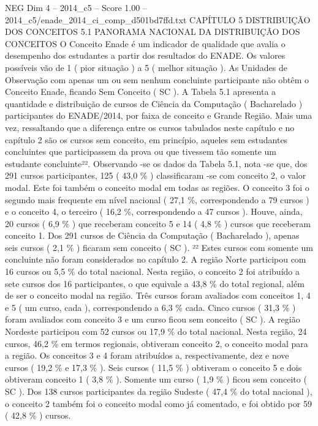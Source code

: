 \begin{textsample}{NEG Dim 4 – 2014\_c5 – Score 1.00 – 2014\_c5/enade\_2014\_ci\_comp\_d501bd7ffd.txt}  \label{ex:f4_neg_199}
CAPÍTULO 5 DISTRIBUIÇÃO DOS CONCEITOS 5.1 PANORAMA NACIONAL DA DISTRIBUIÇÃO DOS CONCEITOS O Conceito Enade é um indicador de qualidade que avalia o desempenho dos estudantes a partir dos resultados do ENADE.
Os valores possíveis vão de 1 ( pior situação ) a 5 ( melhor situação ).
As Unidades de Observação com apenas um ou sem nenhum concluinte participante não obtêm o Conceito Enade, ficando Sem Conceito ( SC ).
A Tabela 5.1 apresenta a quantidade e distribuição de cursos de Ciência da Computação ( Bacharelado ) participantes do ENADE/2014, por faixa de conceito e Grande Região.
Mais uma vez, ressaltando que a diferença entre os cursos tabulados neste capítulo e no capítulo 2 são os cursos sem conceito, em princípio, aqueles sem estudantes concluintes que participassem da prova ou que tivessem tão somente um estudante concluinte²².
Observando -se os dados da Tabela 5.1, nota -se que, dos 291 cursos participantes, 125 ( 43,0 \% ) classificaram -se com conceito 2, o valor modal.
Este foi também o conceito modal em todas as regiões.
O conceito 3 foi o segundo mais frequente em nível nacional ( 27,1 \%, correspondendo a 79 cursos ) e o conceito 4, o terceiro ( 16,2 \%, correspondendo a 47 cursos ).
Houve, ainda, 20 cursos ( 6,9 \% ) que receberam conceito 5 e 14 ( 4,8 \% ) cursos que receberam conceito 1.
Dos 291 cursos de Ciência da Computação ( Bacharelado ), apenas seis cursos ( 2,1 \% ) ficaram sem conceito ( SC ). ²² Estes cursos com somente um concluinte não foram considerados no capítulo 2.
A região Norte participou com 16 cursos ou 5,5 \% do total nacional.
Nesta região, o conceito 2 foi atribuído a sete cursos dos 16 participantes, o que equivale a 43,8 \% do total regional, além de ser o conceito modal na região.
Três cursos foram avaliados com conceitos 1, 4 e 5 ( um curso, cada ), correspondendo a 6,3 \% cada.
Cinco cursos ( 31,3 \% ) foram avaliados com conceito 3 e um curso ficou sem conceito ( SC ).
A região Nordeste participou com 52 cursos ou 17,9 \% do total nacional.
Nesta região, 24 cursos, 46,2 \% em termos regionais, obtiveram conceito 2, o conceito modal para a região.
Os conceitos 3 e 4 foram atribuídos a, respectivamente, dez e nove cursos ( 19,2 \% e 17,3 \% ).
Seis cursos ( 11,5 \% ) obtiveram o conceito 5 e dois obtiveram conceito 1 ( 3,8 \% ).
Somente um curso ( 1,9 \% ) ficou sem conceito ( SC ).
Dos 138 cursos participantes da região Sudeste ( 47,4 \% do total nacional ), o conceito 2 também foi o conceito modal como já comentado, e foi obtido por 59 ( 42,8 \% ) cursos.

\end{textsample}
